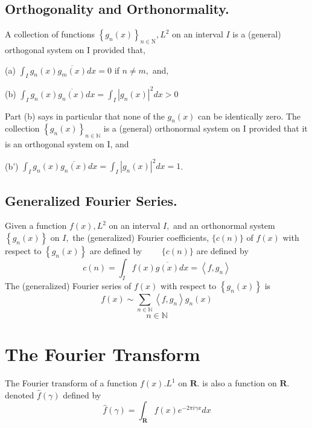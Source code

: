 \subsection{Orthogonality and Orthonormality.}
\begin{definition}
A collection of functions $\left\{g_{n}(x)\right\}_{n \in \mathrm{N}}, L^{2}$ on an interval $I$ is a (general) orthogonal system on I provided that,


(a) $\int_{I} g_{n}(x) \overline{g_{m}(x)} d x=0$ if $n \neq m,$ and,


(b) $\int_{I} g_{n}(x) \overline{g_{n}(x)} d x=\int_{I}\left|g_{n}(x)\right|^{2} d x>0$


Part (b) says in particular that none of the $g_{n}(x)$ can be identically zero.
The collection $\left\{g_{n}(x)\right\}_{n \in \mathbb{N}}$ is a (general) orthonormal system on I provided that it is an orthogonal system on I, and 

(b') $\int_{I} g_{n}(x) \overline{g_{n}(x)} d x=\int_{I}\left|g_{n}(x)\right|^{2} d x=1$.
\end{definition}

\subsection{Generalized Fourier Series.}

\begin{definition}
Given a function $f(x), L^{2}$ on an interval $I,$ and an orthonormal system $\left\{g_{n}(x)\right\}$ on $I,$ the (generalized) Fourier coefficients, $\{c(n)\}$ of $f(x)$ with respect to $\left\{g_{n}(x)\right\}$ are defined by
$\qquad\{ c(n)\}$ are defined by
$$
c(n)=\int_{I} f(x) \overline{g(x)} d x=\left\langle f, g_{n}\right\rangle
$$
The (generalized) Fourier series of $f(x)$ with respect to $\left\{g_{n}(x)\right\}$ is
$$
f(x) \sim \sum_{n \in \mathbb{N}}\left\langle f, g_{n}\right\rangle g_{n}(x)
$$
$$
n \in \mathbb{N}
$$
\end{definition}

\section{The Fourier Transform}
\begin{definition}
 The Fourier transform of a function $f(x) . L^{1}$ on $\mathbf{R} .$ is also a function on $\mathbf{R} .$ denoted $\widehat{f}(\gamma)$ defined by
$$
\widehat{f}(\gamma)=\int_{\mathbf{R}} f(x) e^{-2 \pi i \gamma x} d x
$$
\end{definition}

